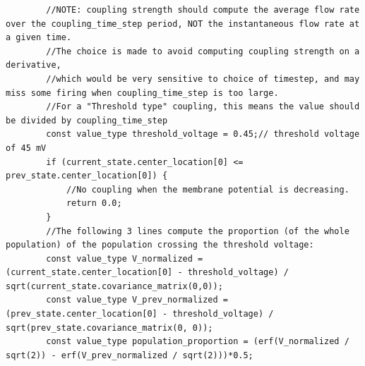 \documentclass[10pt]{article} %
\begin{document}
\begin{lstlisting}
        //NOTE: coupling strength should compute the average flow rate over the coupling_time_step period, NOT the instantaneous flow rate at a given time. 
        //The choice is made to avoid computing coupling strength on a derivative, 
        //which would be very sensitive to choice of timestep, and may miss some firing when coupling_time_step is too large. 
        //For a "Threshold type" coupling, this means the value should be divided by coupling_time_step
        const value_type threshold_voltage = 0.45;// threshold voltage of 45 mV
        if (current_state.center_location[0] <= prev_state.center_location[0]) {
            //No coupling when the membrane potential is decreasing. 
            return 0.0;
        }
        //The following 3 lines compute the proportion (of the whole population) of the population crossing the threshold voltage:
        const value_type V_normalized = (current_state.center_location[0] - threshold_voltage) / sqrt(current_state.covariance_matrix(0,0));
        const value_type V_prev_normalized = (prev_state.center_location[0] - threshold_voltage) / sqrt(prev_state.covariance_matrix(0, 0));
        const value_type population_proportion = (erf(V_normalized / sqrt(2)) - erf(V_prev_normalized / sqrt(2)))*0.5;


\end{lstlisting}
\end{document}
